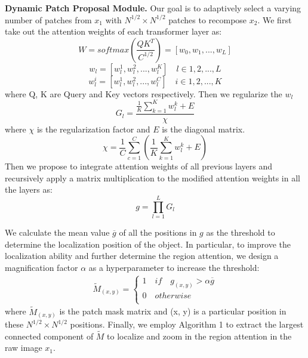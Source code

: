 \documentclass[sigconf]{acmart}
\begin{document}
\textbf{Dynamic Patch Proposal Module.}
Our goal is to adaptively select a varying number of patches from $x_1$ with $N^{1/2}\times N^{1/2}$ patches to recompose $x_2$. We first take out the attention weights of each transformer layer as:
\begin{equation}
W = softmax(\frac{QK^T}{C^{1/2}})= [w_0, w_1, ...,w_L]
\end{equation}
\begin{equation}
w_l = [w_l^1, w_l^2, ...,w_l^K] \quad l\in1,2,...,L
\end{equation}
\begin{equation}
    w_l^i = [w_l^1, w_l^2, ...,w_l^C] \quad i\in1,2,...,K
\end{equation}
where Q, K are Query and Key vectors respectively.
Then we regularize the $w_l$
\begin{equation}
    G_l = \frac{\frac{1}{K}\sum_{k={1}}^{K}w_l^k+E}{\chi}
\end{equation}
where $\chi$ is the regularization factor and $E$ is the diagonal matrix.
\begin{equation}
    \chi = \frac{1}{C}\sum_{c=1}^{C}(\frac{1}{K}\sum_{k={1}}^{K}w_l^k+E)
\end{equation}
Then we propose to integrate attention weights of all previous layers and recursively apply a matrix multiplication to the modified attention weights in all the layers as:
\begin{equation}
    g = \prod_{l=1}^{L}{G_l}
\end{equation}

We calculate the mean value $\overline{g}$ of all the positions in $g$ as the threshold to determine the localization position of the object. In particular, to improve the localization ability and further determine the region attention, we design a magnification factor $\alpha$ as a hyperparameter to increase the threshold:
\begin{align}
    \tilde{M}_{(x,y)} = \begin{cases}
1  \quad if \quad g_{(x,y)} > \alpha \overline{g}\\
0 \quad otherwise \\
\end{cases}
\end{align}
where $\tilde{M}_(x,y)$ is the patch mask matrix and (x, y) is a particular position in these $N^{1/2}\times N^{1/2}$ positions.
Finally, we employ Algorithm 1 to extract the largest connected component of $\tilde{M}$ to localize and zoom in the region attention in the raw image $x_1$.
\end{document}
